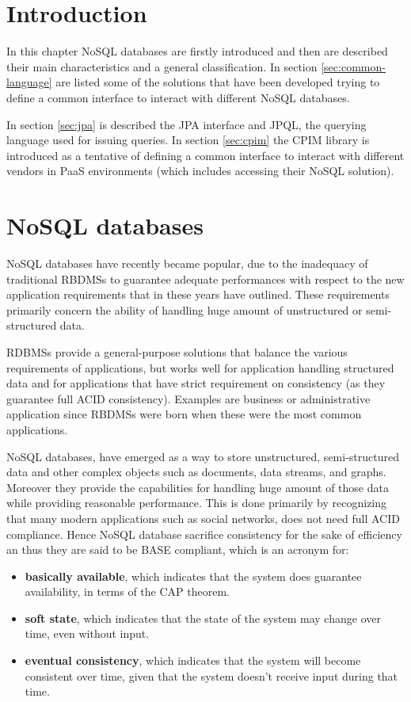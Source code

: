 \section{Introduction}
In this chapter NoSQL databases are firstly introduced and then are described their main characteristics and a general classification. In section \ref{sec:common-language} are listed some of the solutions that have been developed trying to define a common interface to interact with different NoSQL databases.

\noindent In section \ref{sec:jpa} is described the JPA interface and JPQL, the querying language used for issuing queries. In section \ref{sec:cpim} the CPIM library is introduced as a tentative of defining a common interface to interact with different vendors in PaaS environments (which includes accessing their NoSQL solution).

\section{NoSQL databases}
\label{sec:nosql}
NoSQL databases have recently became popular, due to the inadequacy of traditional RBDMSs to guarantee adequate performances with respect to the new application requirements that in these years have outlined. These requirements primarily concern the ability of handling huge amount of unstructured or semi-structured data.

\noindent RDBMSs provide a general-purpose solutions that balance the various requirements of applications, but works well for application handling structured data and for applications that have strict requirement on consistency (as they guarantee full ACID consistency). Examples are business or administrative application since RBDMSs were born when these were the most common applications.

\noindent NoSQL databases, have emerged as a way to store unstructured, semi-structured data and other complex objects such as documents, data streams, and graphs. Moreover they provide the capabilities for handling huge amount of those data while providing reasonable performance.
This is done primarily by recognizing that many modern applications such as social networks, does not need full ACID compliance. Hence NoSQL database sacrifice consistency for the sake of efficiency an thus they are said to be BASE compliant, which is an acronym for:
\begin{itemize}
\item \textbf{basically available}, which indicates that the system does guarantee availability, in terms of the CAP theorem.
\item \textbf{soft state}, which indicates that the state of the system may change over time, even without input. 
\item \textbf{eventual consistency}, which indicates that the system will become consistent over time, given that the system doesn't receive input during that time.
\end{itemize}

